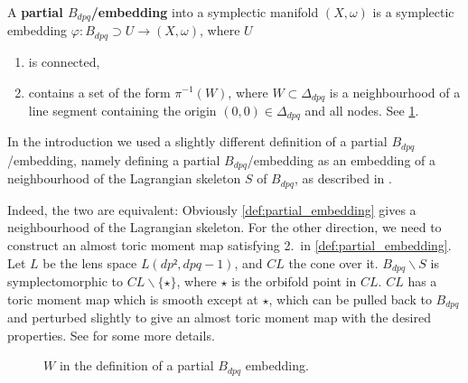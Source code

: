 \documentclass[12pt,a4paper,abstract=true,final]{scrartcl}
\begin{document}
\begin{definition}
    \label{def:partial_embedding}
    A \textbf{partial $B_{dpq}$\-/embedding} into a symplectic manifold $(X,\omega)$ is a symplectic embedding $φ\colon B_{dpq} ⊃ U → (X,ω)$, where $U$ 
    \begin{enumerate}
        \item is connected, 
        \item contains a set of the form $\pi^{-1}(W)$, where $W \subset \Delta_{dpq}$ is a neighbourhood of a line segment containing the origin $(0,0) \in \Delta_{dpq}$ and all nodes.
 See \cref{fig:partial-Bdpq-embedding}.   
    \end{enumerate}
\end{definition}

\begin{remark}
  In the introduction we used a slightly different definition of a partial $B_{dpq}$\-/embedding, namely defining a partial $B_{dpq}$\-/embedding as an embedding of a neighbourhood of the Lagrangian skeleton $S$ of $B_{dpq}$, as described in \cite[Remark 7.10]{evans2021atfs}.

  Indeed, the two are equivalent:
  Obviously \cref{def:partial_embedding} gives a neighbourhood of the Lagrangian skeleton.
  For the other direction, we need to construct an almost toric moment map satisfying 2.\ in \cref{def:partial_embedding}.
  Let $L$ be the lens space $L(dp²,dpq-1)$, and $CL$ the cone over it.
  $B_{dpq} ∖ S$ is symplectomorphic to $C L ∖ \{ ⋆\}$, where $⋆$ is the orbifold point in $CL$.
  $CL$ has a toric moment map which is smooth except at $⋆$, which can be pulled back to $B_{dpq}$ and perturbed slightly to give an almost toric moment map with the desired properties.
  See \cite{Eva19} for some more details.
\end{remark}

\begin{figure}
    \centering
    \caption{$W$ in the definition of a partial $B_{dpq}$ embedding.}
    \label{fig:partial-Bdpq-embedding}
\end{figure}
\end{document}
